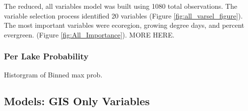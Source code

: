 \documentclass[11pt,]{article}
\begin{document}
The reduced, all variables model was built using 1080 total
observations. The variable selection process identified 20 variables
(Figure \ref{fig:all_varsel_figure}).\\ The most important variables
were ecoregion, growing degree days, and percent evergreen. (Figure
\ref{fig:All_Importance}). MORE HERE.

\subsubsection{Per Lake Probability}\label{per-lake-probability}

Historgram of Binned max prob.

\subsection{Models: GIS Only Variables}\label{models-gis-only-variables}
\end{document}
